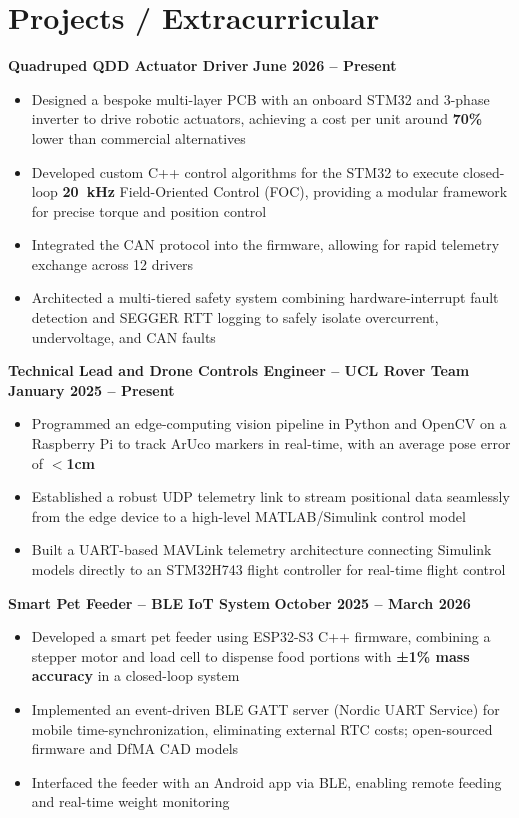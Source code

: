 \documentclass[a4paper,10pt]{article} %
\begin{document}
\section*{Projects / Extracurricular}
\noindent\textbf{Quadruped QDD Actuator Driver} \hfill \textbf{June 2026 – Present}
\begin{itemize}
    \item Designed a bespoke multi-layer PCB with an onboard STM32 and 3-phase inverter to drive robotic actuators, achieving a cost per unit around \textbf{70\%} lower than commercial alternatives
    \item Developed custom C++ control algorithms for the STM32 to execute closed-loop \textbf{20~kHz} Field-Oriented Control (FOC), providing a modular framework for precise torque and position control
    \item Integrated the CAN protocol into the firmware, allowing for rapid telemetry exchange across 12 drivers
    \item Architected a multi-tiered safety system combining hardware-interrupt fault detection and SEGGER RTT logging to safely isolate overcurrent, undervoltage, and CAN  faults
     
\end{itemize}
    
    
\vspace{0.75em}
\noindent\textbf{Technical Lead and Drone Controls Engineer – UCL Rover Team} \hfill \textbf{January 2025 – Present}
\begin{itemize}
    \item Programmed an edge-computing vision pipeline in Python and OpenCV on a Raspberry Pi to track ArUco markers in real-time, with an average pose error of \textbf{$<$1cm}
    \item Established a robust UDP telemetry link to stream positional data seamlessly from the edge device to a high-level MATLAB/Simulink control model
    \item Built a UART-based MAVLink telemetry architecture connecting Simulink models directly to an STM32H743 flight controller for real-time flight control
\end{itemize}
\vspace{0.75em}
\noindent\textbf{Smart Pet Feeder – BLE IoT System} \hfill \textbf{October 2025 – March 2026}
\begin{itemize}
    \item Developed a smart pet feeder using ESP32-S3 C++ firmware, combining a stepper motor and load cell to dispense food portions with \textbf{±1\% mass accuracy} in a closed-loop system
    \item Implemented an event-driven BLE GATT server (Nordic UART Service) for mobile time-synchronization, eliminating external RTC costs; open-sourced firmware and DfMA CAD models
    \item Interfaced the feeder with an Android app via BLE, enabling remote feeding and real-time weight monitoring
\end{itemize}
\end{document}

